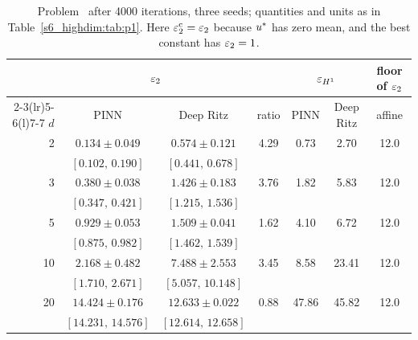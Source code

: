 \begin{table}[tbp]
\centering
\caption{Problem \Ptwo\ after 4000 iterations, three seeds; quantities and units as in
Table~\ref{s6_highdim:tab:p1}. Here $\varepsilon_{2}^{\mathrm{c}}=\varepsilon_{2}$ because $u^{*}$ has zero mean, and the
best constant has $\varepsilon_{2}=1$.}
\label{s6_highdim:tab:p2}
\small
\setlength{\tabcolsep}{6pt}
\begin{tabular}{@{}r cc c cc c@{}}
\toprule
 & \multicolumn{2}{c}{$\varepsilon_{2}$} & & \multicolumn{2}{c}{$\varepsilon_{H^{1}}$} & floor of $\varepsilon_{2}$\\
\cmidrule(lr){2-3}\cmidrule(lr){5-6}\cmidrule(l){7-7}
$d$ & PINN & Deep Ritz & ratio & PINN & Deep Ritz & affine\\
\midrule
2 & $0.134\pm0.049$ & $0.574\pm0.121$ & 4.29 & 0.73 & 2.70 & 12.0 \\
 & {\footnotesize $[0.102,\,0.190]$} & {\footnotesize $[0.441,\,0.678]$} &  &  &  &  \\[2pt]
3 & $0.380\pm0.038$ & $1.426\pm0.183$ & 3.76 & 1.82 & 5.83 & 12.0 \\
 & {\footnotesize $[0.347,\,0.421]$} & {\footnotesize $[1.215,\,1.536]$} &  &  &  &  \\[2pt]
5 & $0.929\pm0.053$ & $1.509\pm0.041$ & 1.62 & 4.10 & 6.72 & 12.0 \\
 & {\footnotesize $[0.875,\,0.982]$} & {\footnotesize $[1.462,\,1.539]$} &  &  &  &  \\[2pt]
10 & $2.168\pm0.482$ & $7.488\pm2.553$ & 3.45 & 8.58 & 23.41 & 12.0 \\
 & {\footnotesize $[1.710,\,2.671]$} & {\footnotesize $[5.057,\,10.148]$} &  &  &  &  \\[2pt]
20 & $14.424\pm0.176$ & $12.633\pm0.022$ & 0.88 & 47.86 & 45.82 & 12.0 \\
 & {\footnotesize $[14.231,\,14.576]$} & {\footnotesize $[12.614,\,12.658]$} &  &  &  &  \\
\bottomrule
\end{tabular}
\end{table}


